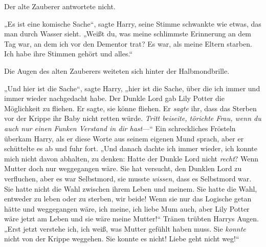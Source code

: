 Der alte Zauberer antwortete nicht.

„Es ist eine komische Sache“, sagte Harry, seine Stimme schwankte wie etwas, das man durch Wasser sieht. „Weißt du, was meine schlimmste Erinnerung an dem Tag war, an dem ich vor den Dementor trat? Es war, als meine Eltern starben. Ich habe ihre Stimmen gehört und alles.“

Die Augen des alten Zauberers weiteten sich hinter der Halbmondbrille.

„Und hier ist die Sache“, sagte Harry, „hier ist die Sache, über die ich immer und immer wieder nachgedacht habe. Der Dunkle Lord gab Lily Potter die Möglichkeit zu fliehen. Er sagte, sie könne fliehen. Er \emph{sagte} ihr, dass das Sterben vor der Krippe ihr Baby nicht retten würde. \emph{Tritt beiseite, törichte Frau, wenn du auch nur einen Funken Verstand in dir hast}—“
Ein schreckliches Frösteln überkam Harry, als er diese Worte aus seinem eigenen Mund sprach, aber er schüttelte es ab und fuhr fort.
„Und danach dachte ich immer wieder, ich konnte mich nicht davon abhalten, zu denken: Hatte der Dunkle Lord nicht \emph{recht}? Wenn Mutter doch nur weggegangen wäre. Sie hat versucht, den Dunklen Lord zu verfluchen, aber es war Selbstmord, sie musste \emph{wissen}, dass es Selbstmord war. Sie hatte nicht die Wahl zwischen ihrem Leben und meinem. Sie hatte die Wahl, entweder zu leben oder zu sterben, wir beide! Wenn sie nur das Logische getan hätte und weggegangen wäre, ich meine, ich liebe Mum auch, aber Lily Potter wäre jetzt am Leben und sie wäre meine Mutter!“
Tränen trübten Harrys Augen.
„Erst jetzt verstehe ich, ich weiß, was Mutter gefühlt haben muss. Sie \emph{konnte} nicht von der Krippe weggehen. Sie konnte es nicht! Liebe geht nicht weg!“

